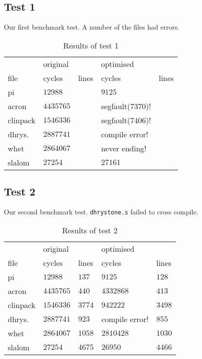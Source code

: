 \subsection{Test 1}

Our first benchmark test. A number of the files had errors.

\begin{table}[ht]
\centering
\begin{tabular}{l l l l l}
\toprule
        &original           &               &optimised          &             \\
file    &cycles     &lines  &cycles     &lines\\
\midrule
pi      &$12988$            &               &$9125$             &             \\
acron   &$4435765$          &               &segfault($7370$)!  &             \\
clinpack&$1546336$          &               &segfault($7406$)!  &             \\
dhrys.  &$2887741$          &               &compile error!     &             \\
whet    &$2864067$          &               &never ending!      &             \\
slalom  &$27254$            &               &$27161$            &             \\
\bottomrule
\end{tabular}
\caption{Results of test 1}
\label{tab:test1}
\end{table}


\subsection{Test 2}

Our second benchmark test. \texttt{dhrystone.s} failed to cross compile.

\begin{table}[ht]
\centering
\begin{tabular}{l l l l l}
\toprule
        &original           &               &optimised          &             \\
file    &cycles     &lines  &cycles     &lines\\
\midrule
pi      &$12988$            &$137$               &$9125$             &$128$             \\
acron   &$4435765$          &$440$               &$4332868$  &$413$             \\
clinpack&$1546336$          &$3774$               &$942222$  &$3498$             \\
dhrys.  &$2887741$          &$923$               &compile error!     &$855$             \\
whet    &$2864067$          &$1058$               &$2810428$      &$1030$             \\
slalom  &$27254$            &$4675$               &$26950$            &$4466$             \\
\bottomrule
\end{tabular}
\caption{Results of test 2}
\label{tab:test2}
\end{table}
